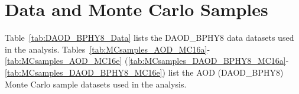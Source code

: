 \section{Data and Monte Carlo Samples}
\label{sec:App_DataMCSamples}

Table~\ref{tab:DAOD_BPHY8_Data} lists the DAOD\_BPHY8 data datasets used in the analysis. 
Tables~\ref{tab:MCsamples_AOD_MC16a}-\ref{tab:MCsamples_AOD_MC16e} (\ref{tab:MCsamples_DAOD_BPHY8_MC16a}-\ref{tab:MCsamples_DAOD_BPHY8_MC16e}) list the AOD (DAOD\_BPHY8) Monte Carlo sample datasets used in the analysis. 












